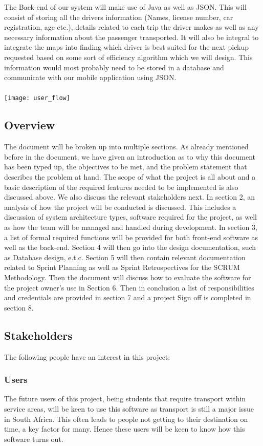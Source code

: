 \documentclass[a4paper,12pt]{article}
\begin{document}
The Back-end of our system will make use of Java as well as JSON. This will consist of storing all the drivers information (Names, license number, car registration, age etc.), details related to each trip the driver makes as well as any necessary information about the passenger transported. It will also be integral to integrate the maps into finding which driver is best suited for the next pickup requested based on some sort of efficiency algorithm which we will design. This information would most probably need to be stored in a database and communicate with our mobile application using JSON. \\\\
\texttt{[image: user\_flow]}
\pagebreak
\subsection{Overview}
The document will be broken up into multiple sections. As already mentioned before in the document, we have given an introduction as to why this document has been typed up, the objectives to be met, and the problem statement that describes the problem at hand. The scope of what the project is all about and a basic description of the required features needed to be implemented is also discussed above. We also discuss the relevant stakeholders next. In section 2, an analysis of how the project will be conducted is discussed. This includes a discussion of system architecture types, software required for the project, as well as how the team will be managed and handled during development. In section 3, a list of formal required functions will be provided for both front-end software as well as the back-end. Section 4 will then go into the design documentation, such as Database design, e.t.c. Section 5 will then contain relevant documentation related to Sprint Planning as well as Sprint Retrospectives for the SCRUM Methodology. Then the document will discuss how to evaluate the software for the project owner's use in Section 6. Then in conclusion a list of responsibilities and credentials are provided in section 7 and a project Sign off is completed in section 8.
\newpage
\subsection{Stakeholders}
The following people have an interest in this project:
\subsubsection{Users}
The future users of this project, being students that require transport within service areas, will be keen to use this software as transport is still a major issue in South Africa. This often leads to people not getting to their destination on time, a key factor for many. Hence these users will be keen to know how this software turns out.
\end{document}
